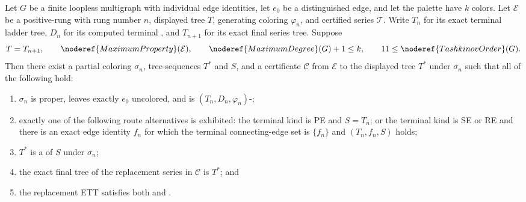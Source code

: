 \begin{lemma}
Let \(G\) be a finite loopless multigraph with individual edge identities,
let \(e_0\) be a distinguished edge, and let the palette have \(k\) colors.
Let \(\mathcal E\) be a positive-rung
 with rung number \(n\), displayed tree
\(T\), generating coloring \(\varphi_n\), and certified series
\(\mathcal T\).  Write \(T_n\) for its exact terminal ladder tree,
\(D_n\) for its computed terminal , and
\(T_{n+1}\) for its exact final series tree.  Suppose
\[
 T=T_{n+1},\qquad \noderef{MaximumProperty}(\mathcal E),\qquad
 \noderef{MaximumDegree}(G)+1\leq k,\qquad
 11\leq\noderef{TashkinovOrder}(G).
\]
Then there exist a partial coloring \(\sigma_n\), tree-sequences
\(T^*\) and \(S\), and a
 certificate \(\mathcal C\)
from \(\mathcal E\) to the displayed tree \(T^*\) under \(\sigma_n\)
such that all of the following hold:
\begin{enumerate}
\item \(\sigma_n\) is proper, leaves exactly \(e_0\) uncolored, and is
      \((T_n,D_n,\varphi_n)\)-;
\item exactly one of the following route alternatives is exhibited: the
      terminal kind is PE and \(S=T_n\); or the terminal kind is SE or RE
      and there is an exact edge identity \(f_n\) for which the terminal
      connecting-edge set is \(\{f_n\}\) and
      \((T_n,f_n,S)\) holds;
\item \(T^*\) is a  of \(S\) under \(\sigma_n\);
\item the exact final tree of the replacement series in \(\mathcal C\)
      is \(T^*\); and
\item the replacement ETT satisfies both  and
      .
\end{enumerate}
\end{lemma}
